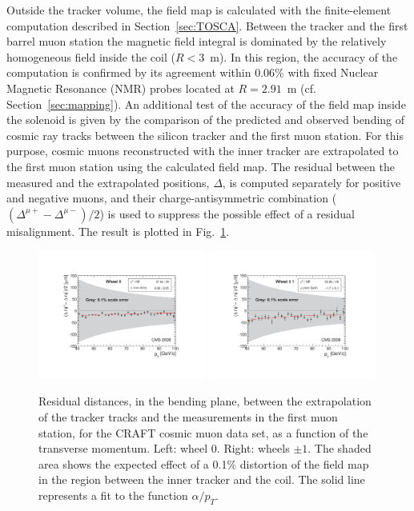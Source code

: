 Outside the tracker volume, the field map is calculated with the
finite-element computation described in Section~\ref{sec:TOSCA}.
Between the tracker and the first barrel muon station the magnetic field
integral is dominated by the relatively homogeneous field inside
the coil ($R<3$~m). In this region, the accuracy of the computation is
confirmed by its agreement within 0.06\% with fixed Nuclear Magnetic
Resonance (NMR) probes located at $R=2.91$~m (cf. Section~\ref{sec:mapping}).
An additional test of the accuracy of the field map inside
the solenoid is given by the comparison of the predicted and observed
bending of cosmic ray tracks between the silicon tracker and the first
muon station. For this purpose, cosmic muons reconstructed with the
inner tracker are extrapolated to the first muon station using the
calculated field map. The residual between the measured and the
extrapolated positions, $\Delta$, is computed separately for positive and negative
muons, and their charge-antisymmetric combination
($(\Delta^{\mu+}-\Delta^{\mu-})/2$) is used to suppress the
possible effect of a residual misalignment. The result
is plotted in Fig.~\ref{fig:accuracyTkMB1}.
\begin{figure}
  \begin{center}
    \includegraphics[width=0.49\textwidth]{fig/bfieldresid_wheel0_top-and-bottom_1ppm-1.pdf}
    \includegraphics[width=0.49\textwidth]{fig/bfieldresid_wheelpm1_top-and-bottom_1ppm-1.pdf}
    \caption{Residual distances, in the bending plane, between the
      extrapolation of the tracker tracks and the measurements in the
      first muon station, for the CRAFT cosmic muon data set, as a
      function of the transverse momentum.
      Left: wheel 0. Right: wheels $\pm1$.
      The shaded area shows the expected effect of a
      0.1\% distortion of the field map in the region between the
      inner tracker and the coil.  The solid line represents a fit to
      the function $\alpha/p_T$.
      }
    \label{fig:accuracyTkMB1}
  \end{center}
\end{figure}
